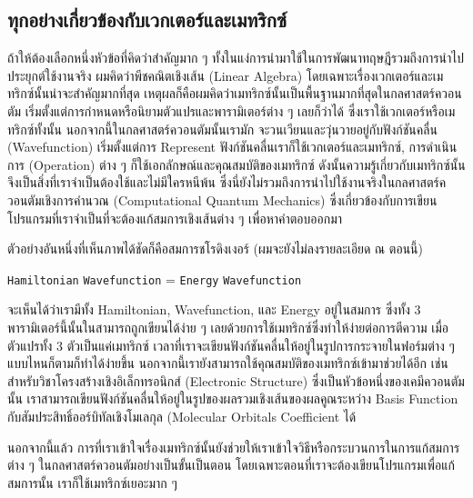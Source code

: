 \subsection{ทุกอย่างเกี่ยวข้องกับเวกเตอร์และเมทริกซ์}

ถ้าให้ต้องเลือกหนึ่งหัวข้อที่คิดว่าสำคัญมาก ๆ ทั้งในแง่การนำมาใช้ในการพัฒนาทฤษฎีรวมถึงการนำไปประยุกต์ใช้งานจริง ผมคิดว่าพีชคณิตเชิงเส้น
(Linear Algebra) โดยเฉพาะเรื่องเวกเตอร์และเมทริกซ์นั้นน่าจะสำคัญมากที่สุด เหตุผลก็คือผมคิดว่าเมทริกซ์นั้นเป็นพื้นฐานมากที่สุดในกลศาสตร์ควอนตัม
เริ่มตั้งแต่การกำหนดหรือนิยามตัวแปรและพารามิเตอร์ต่าง ๆ เลยก็ว่าได้ ซึ่งเราใช้เวกเตอร์หรือเมทริกซ์ทั้งนั้น นอกจากนี้ในกลศาสตร์ควอนตัมนั้นเรามัก%
จะวนเวียนและวุ่นวายอยู่กับฟังก์ชันคลื่น (Wavefunction) เริ่มตั้งแต่การ Represent ฟังก์ชันคลื่นเราก็ใช้เวกเตอร์และเมทริกซ์, การดำเนินการ
(Operation) ต่าง ๆ ก็ใช้เอกลักษณ์และคุณสมบัติของเมทริกซ์ ดังนั้นความรู้เกี่ยวกับเมทริกซ์นั้นจึงเป็นสิ่งที่เราจำเป็นต้องใช้และไม่มีใครหนีพ้น
ซึ่งนี่ยังไม่รวมถึงการนำไปใช้งานจริงในกลศาสตร์ควอนตัมเชิงการคำนวณ (Computational Quantum Mechanics) ซึ่งเกี่ยวข้องกับการเขียน%
โปรแกรมที่เราจำเป็นที่จะต้องแก้สมการเชิงเส้นต่าง ๆ เพื่อหาคำตอบออกมา

ตัวอย่างอันหนึ่งที่เห็นภาพได้ชัดก็คือสมการชโรดิงเงอร์ (ผมจะยังไม่ลงรายละเอียด ณ ตอนนี้)

\begin{tcolorbox}
  \texttt{Hamiltonian} \cdot \texttt{Wavefunction}
  =
  \texttt{Energy} \cdot \texttt{Wavefunction}
\end{tcolorbox}

\noindent จะเห็นได้ว่าเรามีทั้ง Hamiltonian, Wavefunction, และ Energy อยู่ในสมการ ซึ่งทั้ง 3 พารามิเตอร์นี้นั้นในสามารถถูกเขียนได้ง่าย ๆ
เลยด้วยการใช้เมทริกซ์ซึ่งทำให้ง่ายต่อการตีความ เมื่อตัวแปรทั้ง 3 ตัวเป็นแค่เมทริกซ์ เวลาที่เราจะเขียนฟังก์ชันคลื่นให้อยู่ในรูปการกระจายในฟอร์มต่าง ๆ
แบบไหนก็ตามก็ทำได้ง่ายขึ้น นอกจากนี้เรายังสามารถใช้คุณสมบัติของเมทริกซ์เข้ามาช่วยได้อีก เช่น สำหรับวิชาโครงสร้างเชิงอิเล็กทรอนิกส์ (Electronic
Structure) ซึ่งเป็นหัวข้อหนึ่งของเคมีควอนตัมนั้น เราสามารถเขียนฟังก์ชันคลื่นให้อยู่ในรูปของผลรวมเชิงเส้นของผลคูณระหว่าง Basis Function
กับสัมประสิทธิ์ออร์บิทัลเชิงโมเลกุล (Molecular Orbitals Coefficient ได้

นอกจากนี้แล้ว การที่เราเข้าใจเรื่องเมทริกซ์นั้นยังช่วยให้เราเข้าใจวิธีหรือกระบวนการในการแก้สมการต่าง ๆ ในกลศาสตร์ควอนตัมอย่างเป็นขั้นเป็นตอน
โดยเฉพาะตอนที่เราจะต้องเขียนโปรแกรมเพื่อแก้สมการนั้น เราก็ใช้เมทริกซ์เยอะมาก ๆ

